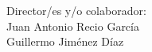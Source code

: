 {\raggedleft
Director/es y/o colaborador:\\
   \vspace{ 1cm}
Juan Antonio Recio García\\
Guillermo Jiménez Díaz\\
}



